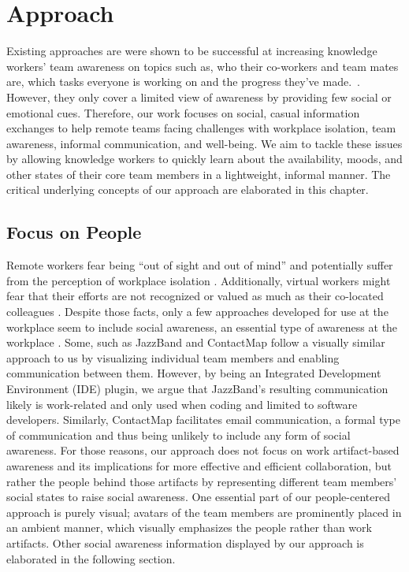 \chapter{Approach}
\label{chapter:approach}
Existing approaches are were shown to be successful at increasing knowledge workers' team awareness on topics such as, who their co-workers and team mates are, which tasks everyone is working on and the progress they've made.~\autocite{dourish1992awareness}. However, they only cover a limited view of awareness by providing few social or emotional cues. Therefore, our work focuses on social, casual information exchanges to help remote teams facing challenges with workplace isolation, team awareness, informal communication, and well-being. We aim to tackle these issues by allowing knowledge workers to quickly learn about the availability, moods, and other states of their core team members in a lightweight, informal manner. The critical underlying concepts of our approach are elaborated in this chapter.

\section{Focus on People}
Remote workers fear being \enquote{out of sight and out of mind} \autocite{bailey1999advantages} and potentially suffer from the perception of workplace isolation \autocite{mulki2009set, marshall2007workplace}. Additionally, virtual workers might fear that their efforts are not recognized or valued as much as their co-located colleagues \autocite{cooper2002telecommuting}. Despite those facts, only a few approaches developed for use at the workplace seem to include social awareness, an essential type of awareness at the workplace \autocite{greenberg1996awareness}. Some, such as JazzBand and ContactMap \autocite{cheng2003jazzing, whittaker2004contactmap} follow a visually similar approach to us by visualizing individual team members and enabling communication between them. However, by being an Integrated Development Environment (IDE) plugin, we argue that JazzBand's resulting communication likely is work-related and only used when coding and limited to software developers. Similarly, ContactMap facilitates email communication, a formal type of communication and thus being unlikely to include any form of social awareness. For those reasons, our approach does not focus on work artifact-based awareness and its implications for more effective and efficient collaboration, but rather the people behind those artifacts by representing different team members' social states to raise social awareness. One essential part of our people-centered approach is purely visual; avatars of the team members are prominently placed in an ambient manner, which visually emphasizes the people rather than work artifacts. Other social awareness information displayed by our approach is elaborated in the following section.

